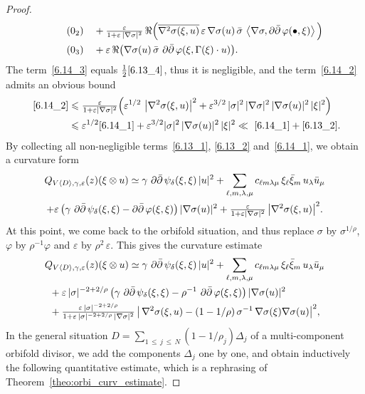 \documentclass[10pt,a4paper]{article}
\DeclareMathOperator{\ddbar}{\partial\bar\partial}
\DeclarePairedDelimiter{\abs}{\lvert}{\rvert}
\let\leq\leqslant
\numberwithin{equation}{section}
\begin{document}
\begin{proof}
\begin{align}
\tag{$\theequation_2$}\label{6.14_2}
&\quad{}+\tfrac{\varepsilon}{ 1+\varepsilon\,\abs{\nabla\sigma}^2}\,\Re\Big(
\overline{\nabla^2\sigma(\xi,u)}\,
\varepsilon\,\nabla\sigma(u)\,\bar\sigma\,
\left\langle\nabla\sigma,\ddbar\varphi(\bullet,\xi)\right\rangle\Big)
\\
\tag{$\theequation_3$}\label{6.14_3}
&\quad{}+\varepsilon\,\Re\big(
\nabla\sigma(u)\,\bar\sigma\,
\ddbar\varphi(\xi,\Gamma(\xi)\cdot u)\big).
\end{align}
The term~\eqref{6.14_3} equals $\tfrac{1}{2}\eqref{6.13_4}$, thus it is negligible, and the term~\eqref{6.14_2} admits an obvious bound
\begin{align*}
~\eqref{6.14_2} &\leq
\tfrac{\varepsilon}{ 1+\varepsilon\abs{\nabla\sigma}^2}
\Big(\varepsilon^{1/2}\,\left|\nabla^2\sigma(\xi,u)\right|^2+\varepsilon^{3/2}\,
\abs{\sigma}^2\,\abs{\nabla\sigma}^2\,\abs{\nabla\sigma(u)}^2\,\abs{\xi}^2\Big)\\
&\leq
\varepsilon^{1/2}\eqref{6.14_1}+
\varepsilon^{3/2}\abs{\sigma}^2\,\abs{\nabla\sigma(u)}^2\,\abs{\xi}^2\ll~\eqref{6.14_1}+\eqref{6.13_2}.
\end{align*}
By collecting all non-negligible terms~\eqref{6.13_1}, \eqref{6.13_2} and~\eqref{6.14_1}, we obtain a curvature form
\begin{multline*}
Q_{V\langle D\rangle,\gamma,\varepsilon}(z)(\xi\otimes u)
\simeq{}\gamma\,\ddbar\psi_\delta(\xi,\xi)\,\abs{u}^2 +\sum_{\ell,m,\lambda,\mu}c_{\ell m\lambda\mu}\,\xi_\ell\bar\xi_m\, u_\lambda\bar u_\mu\\
+\varepsilon\,
\big(\gamma\,\ddbar\psi_\delta(\xi,\xi)-\ddbar\varphi(\xi,\xi)\big)
\,\abs{\nabla\sigma(u)}^2 +\tfrac{\varepsilon}{ 1+\varepsilon\abs{\nabla\sigma}^2}\,
\abs*{\nabla^2\sigma(\xi,u)}^2.
\end{multline*}
At this point, we come back to the orbifold situation, and thus replace $\sigma$ by $\sigma^{1/\rho}$,
$\varphi$ by $\rho^{-1}\varphi$ and $\varepsilon$ by
$\rho^2\,\varepsilon$. This gives the curvature estimate
\begin{multline}
Q_{V\langle D\rangle,\gamma,\varepsilon}(z)(\xi\otimes u)\simeq{}
\gamma\,\ddbar\psi_\delta(\xi,\xi)\,\abs{u}^2 +\sum_{\ell,m,\lambda,\mu}c_{\ell m\lambda\mu}\,\xi_\ell\bar\xi_m\, u_\lambda\bar u_\mu\\
\begin{aligned}
&+\varepsilon\,\abs{\sigma}^{-2+2/\rho}\,
\big(\gamma\,\ddbar\psi_\delta(\xi,\xi)-\rho^{-1}\,\ddbar\varphi(\xi,\xi)\big)
\,\abs{\nabla\sigma(u)}^2
\\
&+\tfrac{\varepsilon\,\abs{\sigma}^{-2+2/\rho}}{ 1+\varepsilon\,\abs{\sigma}^{-2+2/\rho}\,
\abs{\nabla\sigma}^2}\,\big|\,\nabla^2\sigma(\xi,u) -(1-1/\rho)\,\sigma^{-1}\,\nabla\sigma(\xi)\nabla\sigma(u)\big|^2,
\end{aligned}
\end{multline}
In the general situation $D=\sum_{1\,\leq\,j\,\leq\,N}(1-1/\rho_j)\Delta_j$ of a multi-component orbifold divisor, we add the components $\Delta_j$ one by one, and obtain inductively the following quantitative estimate, which is a rephrasing of Theorem~\ref{theo:orbi_curv_estimate}.
\end{proof}
\end{document}
